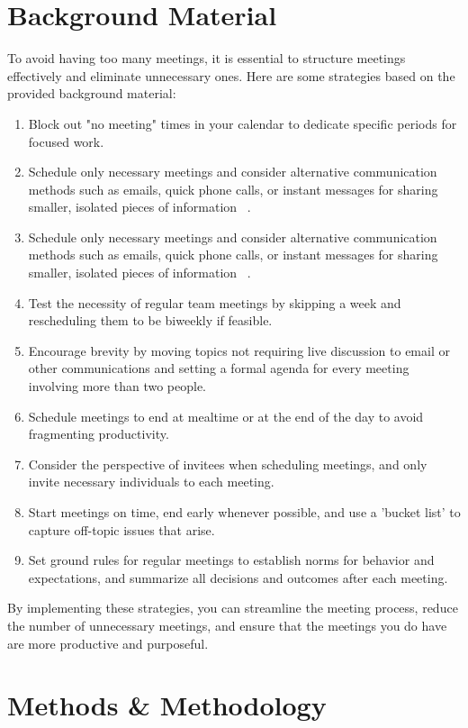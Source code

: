 \section{Background Material}
To avoid having too many meetings, it is essential to structure meetings effectively and eliminate unnecessary ones. Here are some strategies based on the provided background material:
\begin{enumerate}[noitemsep]
 \item Block out "no meeting" times in your calendar to dedicate specific periods for focused work.
 \item Schedule only necessary meetings and consider alternative communication methods such as emails, quick phone calls, or instant messages for sharing smaller, isolated pieces of information ~\cite{06}.
 \item Schedule only necessary meetings and consider alternative communication methods such as emails, quick phone calls, or instant messages for sharing smaller, isolated pieces of information ~\cite{06}.
 \item Test the necessity of regular team meetings by skipping a week and rescheduling them to be biweekly if feasible.
 \item Encourage brevity by moving topics not requiring live discussion to email or other communications and setting a formal agenda for every meeting involving more than two people.
 \item Schedule meetings to end at mealtime or at the end of the day to avoid fragmenting productivity.
 \item Consider the perspective of invitees when scheduling meetings, and only invite necessary individuals to each meeting.
 \item Start meetings on time, end early whenever possible, and use a 'bucket list' to capture off-topic issues that arise.
 \item Set ground rules for regular meetings to establish norms for behavior and expectations, and summarize all decisions and outcomes after each meeting.
\end{enumerate}
By implementing these strategies, you can streamline the meeting process, reduce the number of unnecessary meetings, and ensure that the meetings you do have are more productive and purposeful.
\section{Methods \& Methodology}
